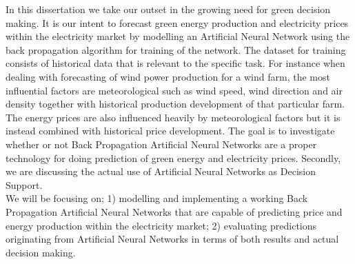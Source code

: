 In this dissertation we take our outset in the growing need for green decision making. It is our intent to forecast green energy production and electricity prices within the electricity market by modelling an Artificial Neural Network using the back propagation algorithm for training of the network. The dataset for training consists of historical data that is relevant to the specific task. For instance when dealing with forecasting of wind power production for a wind farm, the most influential factors are meteorological such as wind speed, wind direction and air density together with historical production development of that particular farm. The energy prices are also influenced heavily by meteorological factors but it is instead combined with historical price development.
The goal is to investigate whether or not Back Propagation Artificial Neural Networks are a proper technology for doing prediction of green energy and electricity prices. Secondly, we are discussing the actual use of Artificial Neural Networks as Decision Support.
\\[0.5cm]
We will be focusing on; 1) modelling and implementing a working Back Propagation Artificial Neural Networks that are capable of predicting price and energy production within the electricity market; 2) evaluating predictions originating from Artificial Neural Networks in terms of both results and actual decision making.